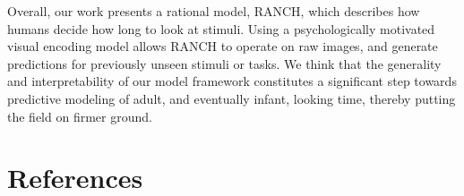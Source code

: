\documentclass[10pt, letterpaper]{article}
\begin{document}
Overall, our work presents a rational model, RANCH, which describes how
humans decide how long to look at stimuli. Using a psychologically
motivated visual encoding model allows RANCH to operate on raw images,
and generate predictions for previously unseen stimuli or tasks. We
think that the generality and interpretability of our model framework
constitutes a significant step towards predictive modeling of adult, and
eventually infant, looking time, thereby putting the field on firmer
ground.

\hypertarget{references}{%
\section{References}\label{references}}

\setlength{\parindent}{-0.1in} 
\setlength{\leftskip}{0.125in}

\noindent
\end{document}
